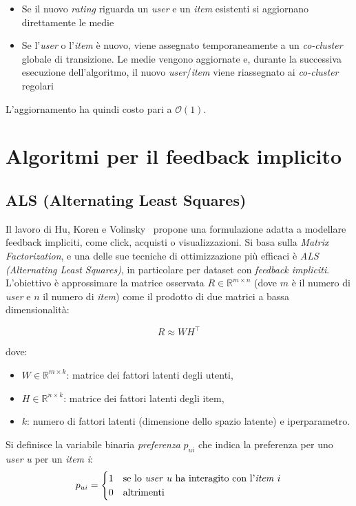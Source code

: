 \begin{itemize}
  \item Se il nuovo \textit{rating} riguarda un \textit{user} e un \textit{item} esistenti si aggiornano direttamente le medie
  \item Se l'\textit{user} o l'\textit{item} è nuovo, viene assegnato temporaneamente a un \textit{co-cluster} globale di transizione. Le medie vengono aggiornate e, durante la successiva esecuzione dell'algoritmo, il nuovo \textit{user}/\textit{item} viene riassegnato ai \textit{co-cluster} regolari
\end{itemize}

L'aggiornamento ha quindi costo pari a $\mathcal{O}(1)$.

\section{Algoritmi per il feedback implicito}

\subsection{ALS (Alternating Least Squares)}\label{als}

Il lavoro di Hu, Koren e Volinsky~\cite{ALS} propone una formulazione adatta a modellare feedback impliciti, come click, acquisti o visualizzazioni. Si basa sulla \textit{Matrix Factorization}, e una delle sue tecniche di ottimizzazione più efficaci è \textit{ALS (Alternating Least Squares)}, in particolare per dataset con \textit{feedback impliciti}. L'obiettivo è approssimare la matrice osservata $R \in \mathbb{R}^{m \times n}$ (dove $m$ è il numero di \textit{user} e $n$ il numero di \textit{item}) come il prodotto di due matrici a bassa dimensionalità:

\[
R \approx W H^\top
\]

dove:

\begin{itemize}
    \item $W \in \mathbb{R}^{m \times k}$: matrice dei fattori latenti degli utenti,
    \item $H \in \mathbb{R}^{n \times k}$: matrice dei fattori latenti degli item,
    \item $k$: numero di fattori latenti (dimensione dello spazio latente) e iperparametro.
\end{itemize}

Si definisce la variabile binaria \textit{preferenza} $p_{ui}$ che indica la preferenza per uno \textit{user} \textit{u} per un \textit{item} \textit{i}:
\[
p_{ui} =
\begin{cases}
    1 & \text{se lo \textit{user} } u \text{ ha interagito con l'\textit{item} } i \\
    0 & \text{altrimenti}
\end{cases}
\]

